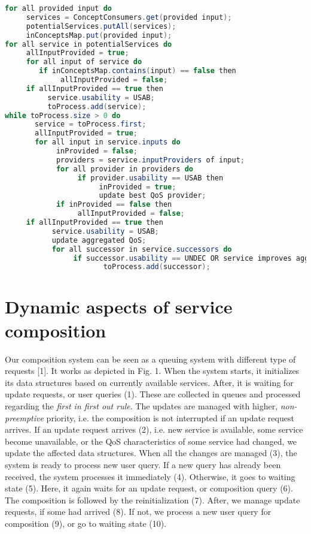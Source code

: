 \documentclass[11pt]{llncs}
\begin{document}
\begin{lstlisting}[language=Java,caption={\normalsize Discover usable services: Input: \emph{provided inputs}}]
for all provided input do
     services = ConceptConsumers.get(provided input);
     potentialServices.putAll(services);
     inConceptsMap.put(provided input);
for all service in potentialServices do
     allInputProvided = true;  
     for all input of service do
        if inConceptsMap.contains(input) == false then
             allInputProvided = false;
     if allInputProvided == true then
          service.usability = USAB;
          toProcess.add(service);
while toProcess.size > 0 do
       service = toProcess.first;
       allInputProvided = true;
       for all input in service.inputs do
            inProvided = false;
            providers = service.inputProviders of input;
            for all provider in providers do
                 if provider.usability == USAB then
                      inProvided = true;
                      update best QoS provider;
            if inProvided == false then
                 allInputProvided = false;
     if allInputProvided == true then
           service.usability = USAB;
           update aggregated QoS;
           for all successor in service.successors do
                if successor.usability == UNDEC OR service improves aggregated QoS of successor then
                       toProcess.add(successor);
\end{lstlisting}

\section{Dynamic aspects of service composition}

Our composition system can be seen as a queuing system with different type of requests
[1]. It works as depicted in Fig. 1. When the system starts, it initializes its
data structures based on currently available services. After, it is waiting for update
requests, or user queries (1). These are collected in queues and processed regarding
the \emph{first in first out rule}. The updates are managed with higher, \emph{non-preemptive} priority,
i.e. the composition is not interrupted if an update request arrives. If an update
request arrives (2), i.e. new service is available, some service become unavailable,
or the QoS characteristics of some service had changed, we update the affected data
structures. When all the changes are managed (3), the system is ready to process
new user query. If a new query has already been received, the system processes it
immediately (4). Otherwise, it goes to waiting state (5). Here, it again waits for an
update request, or composition query (6). The composition is followed by the reinitialization
(7). After, we manage update requests, if some had arrived (8). If not, we
process a new user query for composition (9), or go to waiting state (10).
\end{document}
